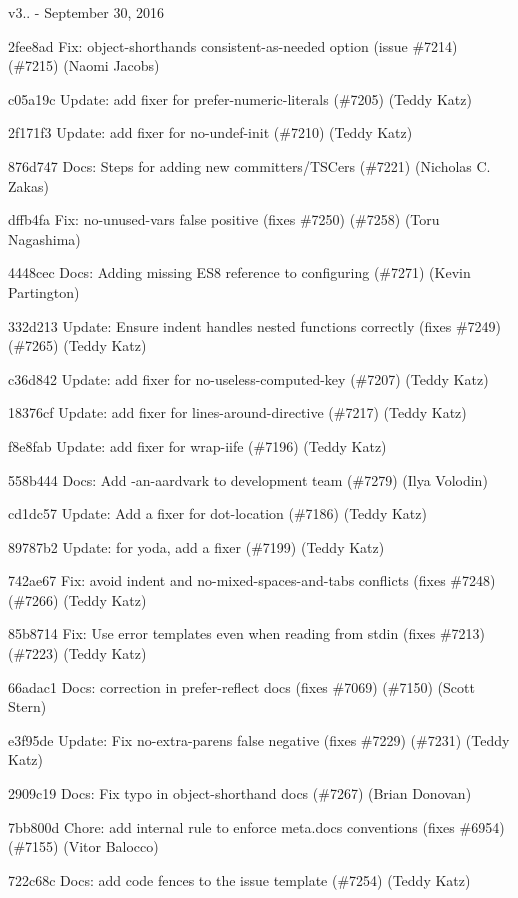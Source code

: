 v3.. -\/ September 30, 2016


\begin{DoxyItemize}
\item 2fee8ad Fix\+: object-\/shorthand\textquotesingle{}s consistent-\/as-\/needed option (issue \#7214) (\#7215) (Naomi Jacobs)
\item c05a19c Update\+: add fixer for {\ttfamily prefer-\/numeric-\/literals} (\#7205) (Teddy Katz)
\item 2f171f3 Update\+: add fixer for {\ttfamily no-\/undef-\/init} (\#7210) (Teddy Katz)
\item 876d747 Docs\+: Steps for adding new committers/\+T\+S\+Cers (\#7221) (Nicholas C. Zakas)
\item dffb4fa Fix\+: {\ttfamily no-\/unused-\/vars} false positive (fixes \#7250) (\#7258) (Toru Nagashima)
\item 4448cec Docs\+: Adding missing E\+S8 reference to configuring (\#7271) (Kevin Partington)
\item 332d213 Update\+: Ensure {\ttfamily indent} handles nested functions correctly (fixes \#7249) (\#7265) (Teddy Katz)
\item c36d842 Update\+: add fixer for {\ttfamily no-\/useless-\/computed-\/key} (\#7207) (Teddy Katz)
\item 18376cf Update\+: add fixer for {\ttfamily lines-\/around-\/directive} (\#7217) (Teddy Katz)
\item f8e8fab Update\+: add fixer for {\ttfamily wrap-\/iife} (\#7196) (Teddy Katz)
\item 558b444 Docs\+: Add -\/an-\/aardvark to development team (\#7279) (Ilya Volodin)
\item cd1dc57 Update\+: Add a fixer for {\ttfamily dot-\/location} (\#7186) (Teddy Katz)
\item 89787b2 Update\+: for {\ttfamily yoda}, add a fixer (\#7199) (Teddy Katz)
\item 742ae67 Fix\+: avoid indent and no-\/mixed-\/spaces-\/and-\/tabs conflicts (fixes \#7248) (\#7266) (Teddy Katz)
\item 85b8714 Fix\+: Use error templates even when reading from stdin (fixes \#7213) (\#7223) (Teddy Katz)
\item 66adac1 Docs\+: correction in prefer-\/reflect docs (fixes \#7069) (\#7150) (Scott Stern)
\item e3f95de Update\+: Fix {\ttfamily no-\/extra-\/parens} false negative (fixes \#7229) (\#7231) (Teddy Katz)
\item 2909c19 Docs\+: Fix typo in object-\/shorthand docs (\#7267) (Brian Donovan)
\item 7bb800d Chore\+: add internal rule to enforce meta.\+docs conventions (fixes \#6954) (\#7155) (Vitor Balocco)
\item 722c68c Docs\+: add code fences to the issue template (\#7254) (Teddy Katz)
\end{DoxyItemize}

